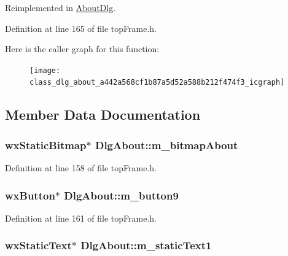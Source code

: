 Reimplemented in \hyperlink{class_about_dlg_a5bd40ed513ca05b4e6546b3b4dcf1c0d}{About\-Dlg}.



Definition at line 165 of file top\-Frame.\-h.



Here is the caller graph for this function\-:
\nopagebreak
\begin{figure}[H]
\begin{center}
\leavevmode
\texttt{[image: class\_dlg\_about\_a442a568cf1b87a5d52a588b212f474f3\_icgraph]}
\end{center}
\end{figure}




\subsection{Member Data Documentation}
\hypertarget{class_dlg_about_a7c406607035a55b453d7edcce9566c34}{
\subsubsection[{m\-\_\-bitmap\-About}]{\setlength{\rightskip}{0pt plus 5cm}wx\-Static\-Bitmap$\ast$ Dlg\-About\-::m\-\_\-bitmap\-About\hspace{0.3cm}{\ttfamily [protected]}}}\label{class_dlg_about_a7c406607035a55b453d7edcce9566c34}


Definition at line 158 of file top\-Frame.\-h.

\hypertarget{class_dlg_about_a21c9c302df2e7f154ff410c732e6846f}{
\subsubsection[{m\-\_\-button9}]{\setlength{\rightskip}{0pt plus 5cm}wx\-Button$\ast$ Dlg\-About\-::m\-\_\-button9\hspace{0.3cm}{\ttfamily [protected]}}}\label{class_dlg_about_a21c9c302df2e7f154ff410c732e6846f}


Definition at line 161 of file top\-Frame.\-h.

\hypertarget{class_dlg_about_adce6520e7385ff5ff3f032c4ed44bc14}{
\subsubsection[{m\-\_\-static\-Text1}]{\setlength{\rightskip}{0pt plus 5cm}wx\-Static\-Text$\ast$ Dlg\-About\-::m\-\_\-static\-Text1\hspace{0.3cm}{\ttfamily [protected]}}}\label{class_dlg_about_adce6520e7385ff5ff3f032c4ed44bc14}


